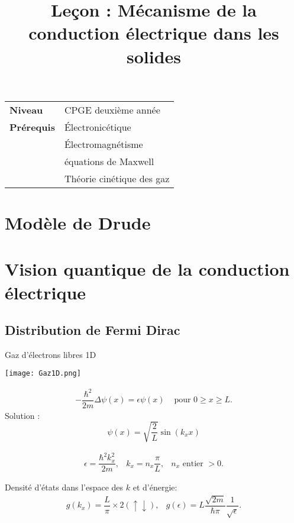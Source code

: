 \documentclass[10pt]{beamer}
\title{Leçon : Mécanisme de la conduction électrique dans les solides}
\begin{document}
\begin{frame}{}
    \titlepage

    \begin{tabularx}{\textwidth}{l@{:\,\,}X}
        \textbf{Niveau} 	  & CPGE deuxième année\\
        \textbf{Prérequis} & Électronicétique \\
        & Électromagnétisme \\
        & équations de Maxwell \\
        & Théorie cinétique des gaz
        
    \end{tabularx}
\end{frame}

\begin{frame}
    \tableofcontents
\end{frame}


\section{Modèle de Drude}
\section{Vision quantique de la conduction électrique}
\subsection{Distribution de Fermi Dirac}
\begin{frame}{Gaz d'électrons libres 1D}
\begin{minipage}{.45\textwidth}
    \centering
    \texttt{[image: Gaz1D.png]}
\end{minipage}
\begin{minipage}{.45\textwidth}
    \begin{equation}
        \begin{array}{cc}
        -\dfrac{\hbar^2}{2m}\Delta\psi(x)=\epsilon\psi(x) & \text{ pour } 0 \geq x\geq L.
        \end{array}
    \end{equation}
    Solution : 
    \begin{equation}
        \psi(x)=\sqrt{\dfrac{2}{L}}\sin(k_x x)
    \end{equation}

    \begin{equation}
        \begin{array}{ccc}
        \epsilon=\dfrac{\hbar^2k_x^2}{2m}, & k_x=n_x\dfrac{\pi}{L}, & n_x \text{ entier } >0.
        \end{array}
    \end{equation}
\end{minipage}
\pause
Densité d'états dans l'espace des $k$ et d'énergie:
\begin{equation}
    \begin{array}{cc}
    g(k_x)=\dfrac{L}{\pi}\times 2 (\uparrow\downarrow), &  g(\epsilon)=L\dfrac{\sqrt{2m}}{\hbar\pi}\dfrac{1}{\sqrt{\epsilon}}.
    \end{array}
\end{equation}
\end{frame}
\end{document}
